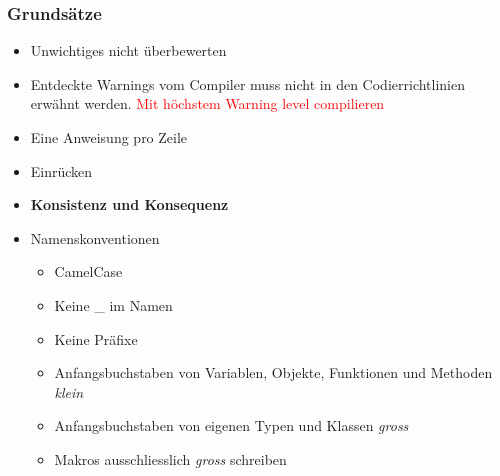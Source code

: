 \subsubsection{Grunds\"atze}
\begin{itemize}
    \item Unwichtiges nicht \"uberbewerten
    \item Entdeckte Warnings vom Compiler muss nicht in den Codierrichtlinien erwähnt werden.
    \textcolor{red}{Mit h\"ochstem Warning level compilieren}
    \item Eine Anweisung pro Zeile
    \item Einr\"ucken
    \item \textbf{Konsistenz und Konsequenz}
    \item Namenskonventionen
    \begin{itemize}
        \item CamelCase
        \item Keine \_ im Namen
        \item Keine Pr\"afixe
        \item Anfangsbuchstaben von Variablen, Objekte, Funktionen und Methoden \textit{klein}
        \item Anfangsbuchstaben von eigenen Typen und Klassen \textit{gross}
        \item Makros ausschliesslich \textit{gross} schreiben
    \end{itemize}
\end{itemize}